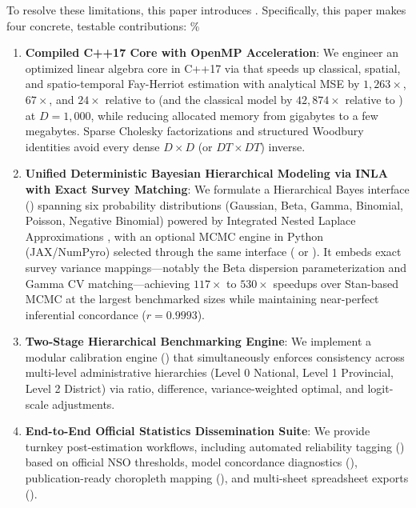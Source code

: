 To resolve these limitations, this paper introduces . Specifically, this paper makes four concrete, testable contributions:
\%

\begin{enumerate}
  \item \textbf{Compiled C++17 Core with OpenMP Acceleration}: We engineer an optimized linear algebra core in C++17 via  that speeds up classical, spatial, and spatio-temporal Fay-Herriot estimation with analytical MSE by $1,263\times$, $67\times$, and $24\times$ relative to  (and the classical model by $42,874\times$ relative to ) at $D=1,000$, while reducing allocated memory from gigabytes to a few megabytes. Sparse Cholesky factorizations and structured Woodbury identities avoid every dense $D \times D$ (or $DT \times DT$) inverse.
  \item \textbf{Unified Deterministic Bayesian Hierarchical Modeling via INLA with Exact Survey Matching}: We formulate a Hierarchical Bayes interface () spanning six probability distributions (Gaussian, Beta, Gamma, Binomial, Poisson, Negative Binomial) powered by Integrated Nested Laplace Approximations \citep{rue2009approximate}, with an optional MCMC engine in Python (JAX/NumPyro) selected through the same interface ( or ). It embeds exact survey variance mappings---notably the \citet{janicki2020properties} Beta dispersion parameterization and Gamma CV matching---achieving $117\times$ to $530\times$ speedups over Stan-based MCMC at the largest benchmarked sizes while maintaining near-perfect inferential concordance ($r = 0.9993$).
  \item \textbf{Two-Stage Hierarchical Benchmarking Engine}: We implement a modular calibration engine () that simultaneously enforces consistency across multi-level administrative hierarchies (Level 0 National, Level 1 Provincial, Level 2 District) via ratio, difference, variance-weighted optimal, and logit-scale adjustments.
  \item \textbf{End-to-End Official Statistics Dissemination Suite}: We provide turnkey post-estimation workflows, including automated reliability tagging () based on official NSO thresholds, model concordance diagnostics (), publication-ready choropleth mapping (), and multi-sheet spreadsheet exports ().
\end{enumerate}

